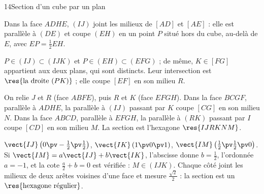 \begin{corrige}{14}{Section d'un cube par un plan}
\begin{codecote}[0.63]
\begin{questions}
  \item Dans la face $ADHE$, $(IJ)$ joint les milieux de $[AD]$ et $[AE]$ : elle est parallèle à $(DE)$ et coupe $(EH)$ en un point
    $P$ situé hors du cube, au-delà de $E$, avec $EP=\frac12EH$.
  \item $P\in(IJ)\subset(IJK)$ et $P\in(EH)\subset(EFG)$ ; de même, $K\in[FG]$ appartient aux deux plans, qui sont distincts. Leur
    intersection est $\res{\text{la droite }(PK)}$ ; elle coupe $[EF]$ en son milieu $R$.
  \item On relie $J$ et $R$ (face $ABFE$), puis $R$ et $K$ (face $EFGH$). Dans la face $BCGF$, parallèle à $ADHE$, la parallèle à
    $(IJ)$ passant par $K$ coupe $[CG]$ en son milieu $N$. Dans la face $ABCD$, parallèle à $EFGH$, la parallèle à $(RK)$ passant par
    $I$ coupe $[CD]$ en son milieu $M$. La section est l'hexagone $\res{IJRKNM}$.
  \item $\vect{IJ}\left(0\pv-\frac12\pv\frac12\right)$, $\vect{IK}\,(1\pv0\pv1)$, $\vect{IM}\left(\frac12\pv\frac12\pv0\right)$. Si
    $\vect{IM}=a\vect{IJ}+b\vect{IK}$, l'abscisse donne $b=\frac12$, l'ordonnée $a=-1$, et la cote $\frac a2+b=0$ est vérifiée :
    $M\in(IJK)$. Chaque côté joint les milieux de deux arêtes voisines d'une face et mesure $\frac{\sqrt2}{2}$ : la section est
    un $\res{\text{hexagone régulier}}$.
\end{questions}
\cote
\centering
{}\\[0.5mm]
\end{codecote}
\end{corrige}
